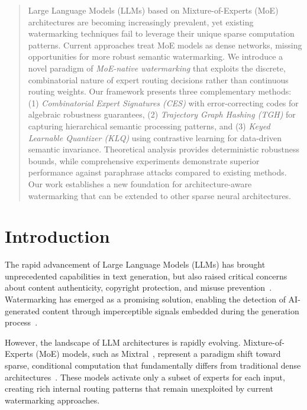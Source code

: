 \begin{abstract}
Large Language Models (LLMs) based on Mixture-of-Experts (MoE) architectures are becoming increasingly prevalent, yet existing watermarking techniques fail to leverage their unique sparse computation patterns. Current approaches treat MoE models as dense networks, missing opportunities for more robust semantic watermarking. We introduce a novel paradigm of \textit{MoE-native watermarking} that exploits the discrete, combinatorial nature of expert routing decisions rather than continuous routing weights. Our framework presents three complementary methods: (1) \textit{Combinatorial Expert Signatures (CES)} with error-correcting codes for algebraic robustness guarantees, (2) \textit{Trajectory Graph Hashing (TGH)} for capturing hierarchical semantic processing patterns, and (3) \textit{Keyed Learnable Quantizer (KLQ)} using contrastive learning for data-driven semantic invariance. Theoretical analysis provides deterministic robustness bounds, while comprehensive experiments demonstrate superior performance against paraphrase attacks compared to existing methods. Our work establishes a new foundation for architecture-aware watermarking that can be extended to other sparse neural architectures.
\end{abstract}

\section{Introduction}

The rapid advancement of Large Language Models (LLMs) has brought unprecedented capabilities in text generation, but also raised critical concerns about content authenticity, copyright protection, and misuse prevention~\cite{christ2023watermarking}. Watermarking has emerged as a promising solution, enabling the detection of AI-generated content through imperceptible signals embedded during the generation process~\cite{kirchenbauer2023watermark}.

However, the landscape of LLM architectures is rapidly evolving. Mixture-of-Experts (MoE) models, such as Mixtral~\cite{jiang2024mixtral}, represent a paradigm shift toward sparse, conditional computation that fundamentally differs from traditional dense architectures~\cite{fedus2021switch}. These models activate only a subset of experts for each input, creating rich internal routing patterns that remain unexploited by current watermarking approaches.


